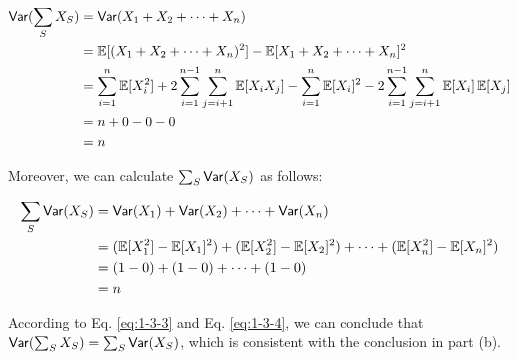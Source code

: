 \begin{problem}[30 points]
\begin{enumerate}[(a)]
\begin{align} \label{eq:1-3-3}
\mathsf{Var}(\sum_{S}X_S) &= \mathsf{Var}(X_1 + X_2 + \cdots + X_n) \notag \\
&= \operatorname*{\mathbb{E}}[(X_1 + X_2 + \cdots + X_n)^2] - \operatorname*{\mathbb{E}}[X_1 + X_2 + \cdots + X_n]^2  \notag  \\
&= \sum_{i=1}^n\operatorname*{\mathbb{E}}[X_i^2] + 2\sum_{i=1}^{n-1}\sum_{j=i+1}^{n}\operatorname*{\mathbb{E}}[X_iX_j] - \sum_{i=1}^n\operatorname*{\mathbb{E}}[X_i]^2 - 2\sum_{i=1}^{n-1}\sum_{j=i+1}^{n}\operatorname*{\mathbb{E}}[X_i]\operatorname*{\mathbb{E}}[X_j] \notag \\
&= n + 0 - 0 - 0 \notag  \\
&= n
\end{align}

Moreover, we can calculate $\sum_{S}\mathsf{Var}(X_S)$ as follows:

\begin{align} \label{eq:1-3-4}
\sum_{S}\mathsf{Var}(X_S) &= \mathsf{Var}(X_1) + \mathsf{Var}(X_2) + \cdots + \mathsf{Var}(X_n) \notag \\
&= (\operatorname*{\mathbb{E}}[X_1^2] - \operatorname*{\mathbb{E}}[X_1]^2) + (\operatorname*{\mathbb{E}}[X_2^2] - \operatorname*{\mathbb{E}}[X_2]^2) + \cdots + (\operatorname*{\mathbb{E}}[X_n^2] - \operatorname*{\mathbb{E}}[X_n]^2) \notag  \\
&= (1 - 0) + (1 - 0) + \cdots + (1 - 0) \notag  \\
&= n
\end{align}

According to Eq. \eqref{eq:1-3-3} and Eq. \eqref{eq:1-3-4}, we can conclude that $\mathsf{Var}(\sum_{S}X_S) = \sum_{S}\mathsf{Var}(X_S)$, which is consistent with the conclusion in part (b).

\end{enumerate}
\end{problem}

~\\

